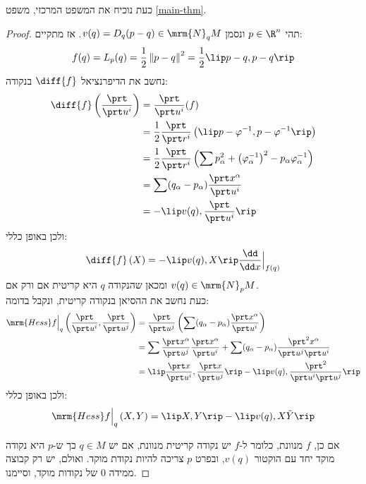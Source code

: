 \documentclass{article}
\theoremstyle{definition}
\newcommand{\norm}[1]{\left\lVert#1\right\rVert}
\begin{document}
	כעת נוכיח את המשפט המרכזי, משפט \ref{main-thm}.
	\begin{proof}
		תהי
		\(p\in\R^n\)
		ונסמן
		\(v(q) = D_q(p-q) \in \mrm{N}_q M\).
		אז מתקיים:
		\[
			f(q)
			=L_p(q)
			=\frac{1}{2}\norm{p-q}^2
			=\frac{1}{2}\lip p-q,p-q \rip
		\]
		נחשב את הדיפרנציאל
		\(\diff{f}\)
		בנקודה:
		\begin{equation*}\begin{split}
			\diff{f}\left(\frac{\prt}{\prt u^i}\right)
			&=\frac{\prt}{\prt u^i}(f)
			\\&=\frac{1}{2}\frac{\prt}{\prt r^i}\left(\lip p-\varphi^{-1},p-\varphi^{-1} \rip\right)
			\\&=\frac{1}{2}\frac{\prt}{\prt r^i}\left(\sum p_\alpha^2+\left(\varphi_\alpha^{-1}\right)^2-p_\alpha\varphi_\alpha^{-1}\right)
			\\&=\sum (q_\alpha-p_\alpha)\frac{\prt x^\alpha}{\prt u^i}
			\\&=-\lip v(q),\frac{\prt}{\prt u^i} \rip
		\end{split}\end{equation*}
		ולכן באופן כללי:
		\[
			\diff{f}\left(X\right)
			=-\lip v(q),X \rip \frac{\dd}{\dd x}\Big|_{f(q)}
		\]
		ומכאן שהנקודה \(q\) היא קריטית אם ורק אם
		\(v(q)\in \mrm{N}_p M\).
		\\
		כעת נחשב את ההסיאן בנקודה קריטית, ונקבל בדומה:
		\begin{equation*}\begin{split}
			\mrm{Hess} f\Big|_q\left(\frac{\prt}{\prt u^i},\frac{\prt}{\prt u^j}\right)
			&=\frac{\prt}{\prt u^j}\left(\sum (q_\alpha-p_\alpha)\frac{\prt x^\alpha}{\prt u^i}\right)
			\\&=\sum \frac{\prt x^\alpha}{\prt u^j}\frac{\prt x^\alpha}{\prt u^i}
			+ \sum (q_\alpha-p_\alpha)\frac{\prt^2 x^\alpha}{\prt u^j\prt u^i}
			\\&=\lip \frac{\prt x}{\prt u^i},\frac{\prt x}{\prt u^j} \rip
			- \lip v(q),\frac{\prt^2}{\prt u^i\prt u^j} \rip
		\end{split}\end{equation*}
		ולכן באופן כללי:
		\[
			\mrm{Hess} f\Big|_q\left(X,Y\right)
			=\lip X,Y \rip - \lip v(q),X\tilde{Y} \rip
		\]
		
		אם כן, \(f\) מנוונת, כלומר ל-\(f\) יש נקודה קריטית מנוונת, אם יש
		\(q \in M\)
		כך ש-\(p\) היא נקודה מוקד יחד עם הוקטור
		\(v(q)\),
		ובפרט \(p\) צריכה להיות נקודת מוקד.
		ואולם, יש רק קבוצה ממידה \(0\) של נקודות מוקד, וסיימנו.
	\end{proof}
	
\end{document}
